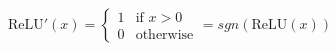\begin{equation}\label{eq:relu-deriv}
    \text{ReLU}'(x) = \begin{cases} 1 & \text{if } x > 0 \\ 0 & \text{otherwise} \end{cases} = sgn(\text{ReLU}(x))
\end{equation}

